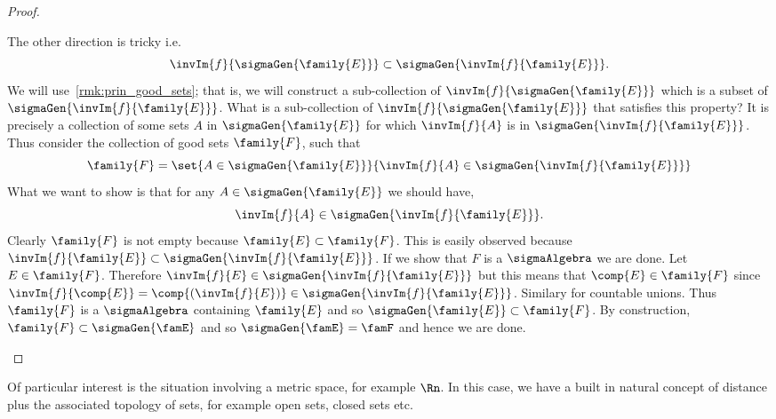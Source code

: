 \begin{proof}
\begin{enumerate}
	    The other direction is tricky i.e.
	    \[\invIm{f}{\sigmaGen{\family{E}}} \subset \sigmaGen{\invIm{f}{\family{E}}}.\] 
	    We will use~\ref{rmk:prin_good_sets}; that is, we will construct a sub-collection of 
	    $\invIm{f}{\sigmaGen{\family{E}}}$ which is a subset of $\sigmaGen{\invIm{f}{\family{E}}}$. What
	    is a sub-collection of $\invIm{f}{\sigmaGen{\family{E}}}$ that satisfies this property? 
	    It is precisely a collection of some sets $A$ in
	    $\sigmaGen{\family{E}}$ for which $\invIm{f}{A}$ is in $\sigmaGen{\invIm{f}{\family{E}}}$.
	    Thus consider the collection of good sets $\family{F}$, such that
	    \begin{equation*}
		\family{F} = \set{A \in \sigmaGen{\family{E}}}{\invIm{f}{A} \in 
		    \sigmaGen{\invIm{f}{\family{E}}}}
	    \end{equation*}
	    What we want to show
	    is that for any $A \in \sigmaGen{\family{E}}$ we should have,
	    \begin{equation*}
		\invIm{f}{A} \in \sigmaGen{\invIm{f}{\family{E}}}.
	    \end{equation*}
	    Clearly $\family{F}$ is not empty because $\family{E} \subset \family{F}$. This
	    is easily observed because $\invIm{f}{\family{E}} \subset
	    \sigmaGen{\invIm{f}{\family{E}}}$. If we show that $F$ is a $\sigmaAlgebra$ we
	    are done.
	    Let $E\in \family{F}$. Therefore $\invIm{f}{E} \in
	    \sigmaGen{\invIm{f}{\family{E}}}$ but
	    this means that $\comp{E} \in \family{F}$ since $\invIm{f}{\comp{E}} =
	    \comp{(\invIm{f}{E})} \in \sigmaGen{\invIm{f}{\family{E}}}$. Similary for 
	    countable unions. Thus $\family{F}$ is a $\sigmaAlgebra$ containing $\family{E}$ 
	    and so $\sigmaGen{\family{E}} \subset \family{F}$. By construction,
	    $\family{F}\subset\sigmaGen{\famE}$ and so $\sigmaGen{\famE} = \famF$ and hence we are done.
    \end{enumerate}
\end{proof}
Of particular interest is the situation involving a metric space, for example $\Rn$. In this case,
we have a built in natural concept of distance plus the associated topology of sets, for example 
open sets, closed sets etc.


